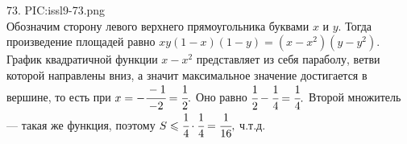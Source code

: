 73. {{PIC:issl9-73.png}}\\
Обозначим сторону левого верхнего прямоугольника буквами $x$ и $y.$ Тогда произведение площадей равно $xy(1-x)(1-y)=(x-x^2)(y-y^2).$ График квадратичной функции $x-x^2$ представляет из себя параболу, ветви которой направлены вниз, а значит максимальное значение достигается в вершине, то есть при $x=-\cfrac{-1}{-2}=\cfrac{1}{2}.$ Оно равно $\cfrac{1}{2}-\cfrac{1}{4}=\cfrac{1}{4}.$ Второй множитель --- такая же функция, поэтому $S\leqslant \cfrac{1}{4}\cdot \cfrac{1}{4}=\cfrac{1}{16},$ ч.т.д.\\
